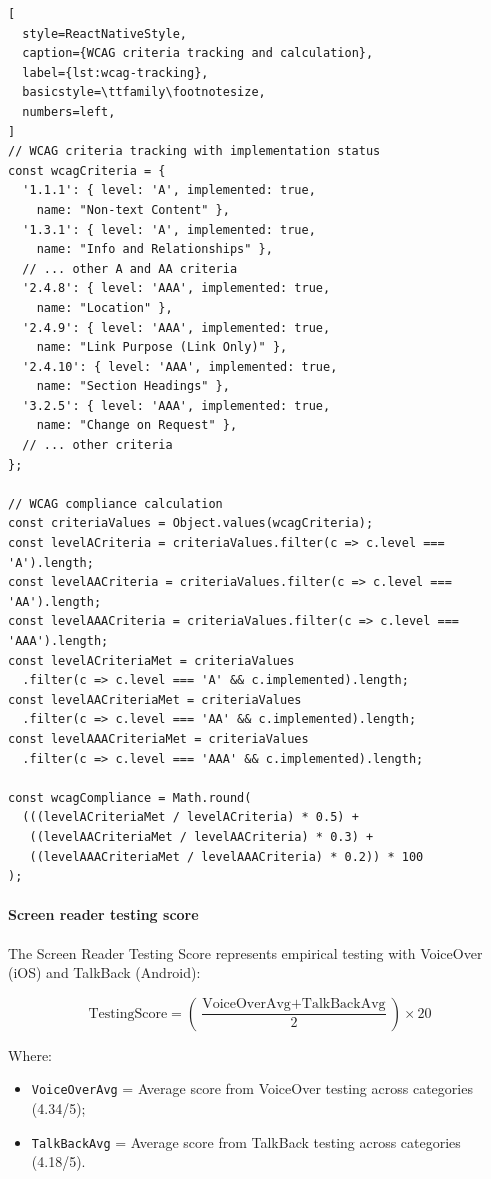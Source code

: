 \begin{lstlisting}[
  style=ReactNativeStyle,
  caption={WCAG criteria tracking and calculation},
  label={lst:wcag-tracking},
  basicstyle=\ttfamily\footnotesize,
  numbers=left,
]
// WCAG criteria tracking with implementation status
const wcagCriteria = {
  '1.1.1': { level: 'A', implemented: true, 
    name: "Non-text Content" },
  '1.3.1': { level: 'A', implemented: true, 
    name: "Info and Relationships" },
  // ... other A and AA criteria
  '2.4.8': { level: 'AAA', implemented: true, 
    name: "Location" },
  '2.4.9': { level: 'AAA', implemented: true, 
    name: "Link Purpose (Link Only)" },
  '2.4.10': { level: 'AAA', implemented: true, 
    name: "Section Headings" },
  '3.2.5': { level: 'AAA', implemented: true, 
    name: "Change on Request" },
  // ... other criteria
};

// WCAG compliance calculation
const criteriaValues = Object.values(wcagCriteria);
const levelACriteria = criteriaValues.filter(c => c.level === 'A').length;
const levelAACriteria = criteriaValues.filter(c => c.level === 'AA').length;
const levelAAACriteria = criteriaValues.filter(c => c.level === 'AAA').length;
const levelACriteriaMet = criteriaValues
  .filter(c => c.level === 'A' && c.implemented).length;
const levelAACriteriaMet = criteriaValues
  .filter(c => c.level === 'AA' && c.implemented).length;
const levelAAACriteriaMet = criteriaValues
  .filter(c => c.level === 'AAA' && c.implemented).length;

const wcagCompliance = Math.round(
  (((levelACriteriaMet / levelACriteria) * 0.5) +
   ((levelAACriteriaMet / levelAACriteria) * 0.3) +
   ((levelAAACriteriaMet / levelAAACriteria) * 0.2)) * 100
);
\end{lstlisting}

\paragraph{Screen reader testing score}

The Screen Reader Testing Score represents empirical testing with VoiceOver (iOS) and TalkBack (Android):

\begin{equation}
\text{TestingScore} 
= \left(\frac{\text{VoiceOverAvg} + \text{TalkBackAvg}}{2}\right) \times 20
\end{equation}

Where:
\begin{itemize}
    \item \texttt{VoiceOverAvg} = Average score from VoiceOver testing across categories (4.34/5);
    \item \texttt{TalkBackAvg} = Average score from TalkBack testing across categories (4.18/5).
\end{itemize}

